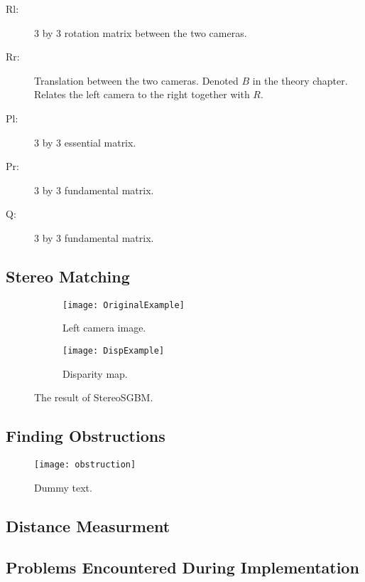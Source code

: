 \begin{description}
	\item[Rl: ] 3 by 3 rotation matrix between the two cameras.
	\item[Rr: ] Translation between the two cameras. Denoted $B$ in the theory chapter. Relates the left camera to the right together with $R$. 
	\item[Pl: ] 3 by 3 essential matrix.
	\item[Pr: ] 3 by 3 fundamental matrix.
	\item[Q: ] 3 by 3 fundamental matrix.

\end{description}


\subsection{Stereo Matching}

\begin{figure}
\centering
 \begin{subfigure}[b]{0.45\textwidth}
        \texttt{[image: OriginalExample]}
        \caption{Left camera image.}
        \label{fig:OriginalExample}
    \end{subfigure}
    \begin{subfigure}[b]{0.45\textwidth}
        \texttt{[image: DispExample]}
        \caption{Disparity map.}
        \label{fig:DispExample}
    \end{subfigure}
    \caption{\label{fig:StereoMatching}The result of StereoSGBM.}
\end{figure}

\subsection{Finding Obstructions}

\begin{figure}
	\texttt{[image: obstruction]}
	\caption{Dummy text. }
	\label{fig:obstruction}
\end{figure}

\subsection{Distance Measurment}

\subsection{Problems Encountered During Implementation }